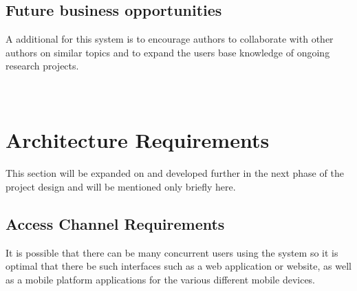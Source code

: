 \documentclass[a4paper]{article}
\begin{document}
	\subsection{Future business opportunities}
	A additional for this system is to encourage authors to collaborate with other authors on similar topics and to expand the users base knowledge of ongoing research projects.
	\\
	\\
	\\
	
	
	\section{Architecture Requirements}
	This section will be expanded on and developed further in the next phase of the project design and will be mentioned only briefly here.
	\\
	\subsection{Access Channel Requirements}
	It is possible that there can be many concurrent users using the system so it is optimal that there be such interfaces such as a web application or website, as well as a mobile platform applications for the various different mobile devices.
	\\
\end{document}

